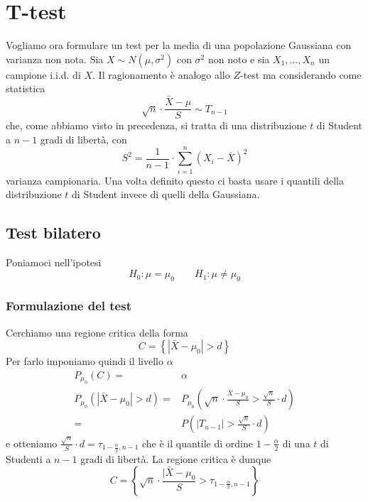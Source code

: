 \section{T-test}
Vogliamo ora formulare un test per la media di una popolazione Gaussiana con varianza non nota. Sia
$X \sim N(\mu, \sigma^2)$ con $\sigma^2$ non noto e sia $X_1, \dots, X_n$ un campione i.i.d. di
$X$. Il ragionamento è analogo allo $Z$-test ma considerando come statistica
\[ \sqrt{n} \cdot \frac{\bar{X} - \mu}{S} \sim T_{n-1} \]
che, come abbiamo visto in precedenza, si tratta di una distribuzione $t$ di Student a $n-1$ gradi
di libertà, con
\[ S^2 = \frac{1}{n-1} \cdot \sum_{i=1}^n \left( X_i - \bar{X} \right)^2 \]
varianza campionaria. Una volta definito questo ci basta usare i quantili della distribuzione $t$
di Student invece di quelli della Gaussiana.

\subsection{Test bilatero}
Poniamoci nell'ipotesi
\[ H_0: \mu = \mu_0 \qquad H_1: \mu \neq \mu_0 \]

\subsubsection{Formulazione del test}
Cerchiamo una regione critica della forma
\[ C = \left\{ |\bar{X} - \mu_0| > d \right\} \]
Per farlo imponiamo quindi il livello $\alpha$
\begin{align*}
	P_{\mu_0} (C) =                     & \alpha \\
	P_{\mu_0} (|\bar{X} - \mu_0| > d) = &
	P_{\mu_0} \left( \sqrt{n} \cdot \frac{\bar{X} - \mu_0}{S} >
	\frac{\sqrt{n}}{S} \cdot d \right)           \\
	=                                   &
	P \left( |T_{n-1}| > \frac{\sqrt{n}}{S} \cdot d \right)
\end{align*}
e otteniamo $\frac{\sqrt{n}}{S} \cdot d = \tau_{1 - \frac{\alpha}{2}, n-1}$ che è il quantile di
ordine $1 - \frac{\alpha}{2}$ di una $t$ di Studenti a $n-1$ gradi di libertà. La regione critica
è dunque
\[
	C = \left\{ \sqrt{n} \cdot \frac{|\bar{X} - \mu_0}{S} >
	\tau_{1 - \frac{\alpha}{2}, n-1} \right\}
\]

